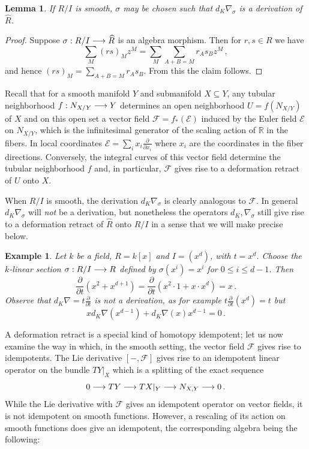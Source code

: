 \documentclass[english,letter paper,12pt,leqno]{article}
\newtheorem{lemma}[theorem]{Lemma}
\theoremstyle{example}
\newtheorem{example}[theorem]{Example}
\numberwithin{equation}{section}
\begin{document}
\begin{lemma} If $R/I$ is smooth, $\sigma$ may be chosen such that $d_K \nabla_\sigma$ is a derivation of $\widehat{R}$.
\end{lemma}
\begin{proof}
Suppose $\sigma: R/I \longrightarrow \widehat{R}$ is an algebra morphism. Then for $r,s \in R$ we have
\[
\sum_M (rs)_M z^M = \sum_M \sum_{A + B = M} r_As_B z^M\,,
\]
and hence $(rs)_M = \sum_{A+B = M} r_A s_B$. From this the claim follows.
\end{proof}

Recall that for a smooth manifold $Y$ and submanifold $X \subseteq Y$, any tubular neighborhood $f: N_{X/Y} \longrightarrow Y$ determines an open neighborhood $U = f(N_{X/Y})$ of $X$ and on this open set a vector field $\mathscr{F} = f_*(\mathscr{E})$ induced by the Euler field $\mathscr{E}$ on $N_{X/Y}$, which is the infinitesimal generator of the scaling action of $\mathbb{R}$ in the fibers. In local coordinates $\mathscr{E} = \sum_i x_i \frac{\partial}{\partial x_i}$ where $x_i$ are the coordinates in the fiber directions. Conversely, the integral curves of this vector field determine the tubular neighborhood $f$ \cite[\S 2.3]{burs} and, in particular, $\mathscr{F}$ gives rise to a deformation retract of $U$ onto $X$.

When $R/I$ is smooth, the derivation $d_K \nabla_\sigma$ is clearly analogous to $\mathscr{F}$. In general $d_K \nabla_\sigma$ will \emph{not} be a derivation, but nonetheless the operators $d_K, \nabla_\sigma$ still give rise to a deformation retract of $\widehat{R}$ onto $R/I$ in a sense that we will make precise below.

\begin{example} Let $k$ be a field, $R = k[x]$ and $I = (x^d)$, with $t = x^d$. Choose the $k$-linear section $\sigma: R/I \longrightarrow R$ defined by $\sigma(x^i) = x^i$ for $0 \le i \le d - 1$. Then
\[
\frac{\partial}{\partial t}( x^2 + x^{d+1} ) = \frac{\partial}{\partial t}( x^2 \cdot 1 + x \cdot x^d ) = x\,.
\]
Observe that $d_K \nabla = t \frac{\partial}{\partial t}$ is \emph{not} a derivation, as for example $t\frac{\partial}{\partial t}( x^d ) = t$ but
\[
x d_K \nabla(x^{d-1}) + d_K \nabla(x) x^{d-1} = 0\,.
\]
\end{example}

A deformation retract is a special kind of homotopy idempotent; let us now examine the way in which, in the smooth setting, the vector field $\mathscr{F}$ gives rise to idempotents. The Lie derivative $[-, \mathscr{F}]$ gives rise to an idempotent linear operator on the bundle $TY|_X$ which is a splitting of the exact sequence 
\[
0 \longrightarrow TY \longrightarrow TX|_Y \longrightarrow N_{X,Y} \longrightarrow 0\,.
\]
While the Lie derivative with $\mathscr{F}$ gives an idempotent operator on vector fields, it is not idempotent on smooth functions. However, a rescaling of its action on smooth functions does give an idempotent, the corresponding algebra being the following:
\end{document}
